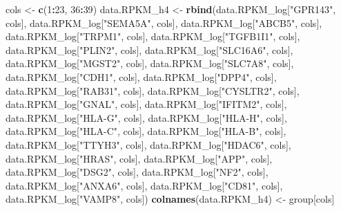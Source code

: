 \documentclass[]{article}
\newenvironment{Shaded}{\begin{snugshade}}{\end{snugshade}}
\newcommand{\KeywordTok}[1]{\textcolor[rgb]{0.13,0.29,0.53}{\textbf{#1}}}
\newcommand{\DecValTok}[1]{\textcolor[rgb]{0.00,0.00,0.81}{#1}}
\newcommand{\StringTok}[1]{\textcolor[rgb]{0.31,0.60,0.02}{#1}}
\newcommand{\OperatorTok}[1]{\textcolor[rgb]{0.81,0.36,0.00}{\textbf{#1}}}
\newcommand{\NormalTok}[1]{#1}
\begin{document}
\begin{Shaded}
\begin{Highlighting}[]
\NormalTok{cols <-}\StringTok{ }\KeywordTok{c}\NormalTok{(}\DecValTok{1}\OperatorTok{:}\DecValTok{23}\NormalTok{, }\DecValTok{36}\OperatorTok{:}\DecValTok{39}\NormalTok{)}
\NormalTok{data.RPKM_h4 <-}\StringTok{ }\KeywordTok{rbind}\NormalTok{(data.RPKM_log[}\StringTok{"GPR143"}\NormalTok{, cols], data.RPKM_log[}\StringTok{"SEMA5A"}\NormalTok{, cols],}
\NormalTok{                      data.RPKM_log[}\StringTok{"ABCB5"}\NormalTok{, cols], data.RPKM_log[}\StringTok{"TRPM1"}\NormalTok{, cols],}
\NormalTok{                      data.RPKM_log[}\StringTok{"TGFB1I1"}\NormalTok{, cols], data.RPKM_log[}\StringTok{"PLIN2"}\NormalTok{, cols],}
\NormalTok{                      data.RPKM_log[}\StringTok{"SLC16A6"}\NormalTok{, cols], data.RPKM_log[}\StringTok{"MGST2"}\NormalTok{, cols],}
\NormalTok{                      data.RPKM_log[}\StringTok{"SLC7A8"}\NormalTok{, cols], data.RPKM_log[}\StringTok{"CDH1"}\NormalTok{, cols],}
\NormalTok{                      data.RPKM_log[}\StringTok{"DPP4"}\NormalTok{, cols], data.RPKM_log[}\StringTok{"RAB31"}\NormalTok{, cols],}
\NormalTok{                      data.RPKM_log[}\StringTok{"CYSLTR2"}\NormalTok{, cols], data.RPKM_log[}\StringTok{"GNAL"}\NormalTok{, cols],}
\NormalTok{                      data.RPKM_log[}\StringTok{"IFITM2"}\NormalTok{, cols], data.RPKM_log[}\StringTok{"HLA-G"}\NormalTok{, cols],}
\NormalTok{                      data.RPKM_log[}\StringTok{"HLA-H"}\NormalTok{, cols], data.RPKM_log[}\StringTok{"HLA-C"}\NormalTok{, cols],}
\NormalTok{                      data.RPKM_log[}\StringTok{"HLA-B"}\NormalTok{, cols], data.RPKM_log[}\StringTok{"TTYH3"}\NormalTok{, cols],}
\NormalTok{                      data.RPKM_log[}\StringTok{"HDAC6"}\NormalTok{, cols], data.RPKM_log[}\StringTok{"HRAS"}\NormalTok{, cols],}
\NormalTok{                      data.RPKM_log[}\StringTok{"APP"}\NormalTok{, cols], data.RPKM_log[}\StringTok{"DSG2"}\NormalTok{, cols],}
\NormalTok{                      data.RPKM_log[}\StringTok{"NF2"}\NormalTok{, cols], data.RPKM_log[}\StringTok{"ANXA6"}\NormalTok{, cols],}
\NormalTok{                      data.RPKM_log[}\StringTok{"CD81"}\NormalTok{, cols], data.RPKM_log[}\StringTok{"VAMP8"}\NormalTok{, cols])}
\KeywordTok{colnames}\NormalTok{(data.RPKM_h4) <-}\StringTok{ }\NormalTok{group[cols]}


\end{Highlighting}
\end{Shaded}
\end{document}
